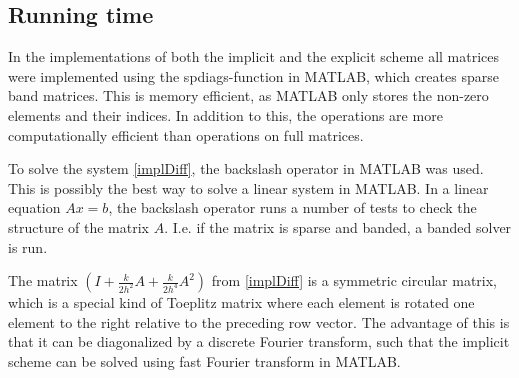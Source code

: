 



\subsection{Running time}
In the implementations of both the implicit and the explicit scheme all matrices were implemented using the spdiags-function in MATLAB, which creates sparse band matrices. This is memory efficient, as MATLAB only stores the non-zero elements and their indices. In addition to this, the operations are more computationally efficient than operations on full matrices. \cite{sparse}

To solve the system \eqref{implDiff}, the backslash operator in MATLAB was used. This is possibly the best way to solve a linear system in MATLAB.  In a linear equation $Ax = b$, the backslash operator runs a number of tests to check the structure of the matrix $A$. I.e. if the matrix is sparse and banded, a banded solver is run.

The matrix $\left( I + \frac{k}{2h^2}A + \frac{k}{2h^4}A^2\right)$ from \eqref{implDiff} is a symmetric circular matrix, which is a special kind of Toeplitz matrix where each element is rotated one element to the right relative to the preceding row vector. The advantage of this is that it can be diagonalized by a discrete Fourier transform, such that the implicit scheme can be solved using fast Fourier transform in MATLAB.

